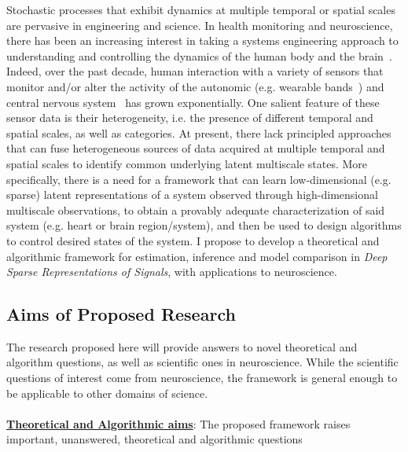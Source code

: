 \documentclass[12pt]{article}
\begin{document}
Stochastic processes that exhibit dynamics at multiple temporal or spatial
scales are pervasive in engineering and science. In health monitoring and neuroscience, there has been an increasing interest in taking a systems engineering approach to understanding and controlling the dynamics of the human body and the brain~\cite{kim2011epidermal2,liberman2013closed}. Indeed, over the past decade, human interaction with a variety of sensors that monitor and/or alter the activity of the autonomic (e.g. wearable bands~\cite{savage2015mobile}) and central nervous system~\cite{sejnowski2014putting} has grown exponentially. One salient feature of these sensor data is their heterogeneity, i.e. the presence of different temporal and spatial scales, as well as categories. At present, there lack principled approaches that
can fuse heterogeneous sources of data acquired at multiple temporal and spatial scales to identify
common underlying latent multiscale states. More specifically, there is a need for a framework that can learn low-dimensional (e.g. sparse) latent representations of a system observed through high-dimensional multiscale observations, to obtain a provably adequate characterization of said system (e.g. heart or brain region/system), and then be used to design algorithms to control desired states of the system. I propose to develop a theoretical and algorithmic framework for estimation, inference and model comparison in \emph{Deep Sparse Representations of Signals}, with applications to neuroscience. 

\subsection*{Aims of Proposed Research}

The research proposed here will provide answers to novel theoretical and algorithm questions, as well as scientific ones in neuroscience. While the scientific questions of interest come from neuroscience, the framework is general enough to be applicable to other domains of science.
\\
\\
\noindent \textbf{\underline{Theoretical and Algorithmic aims}}: The proposed framework raises important, unanswered, theoretical and algorithmic questions 
\end{document}
